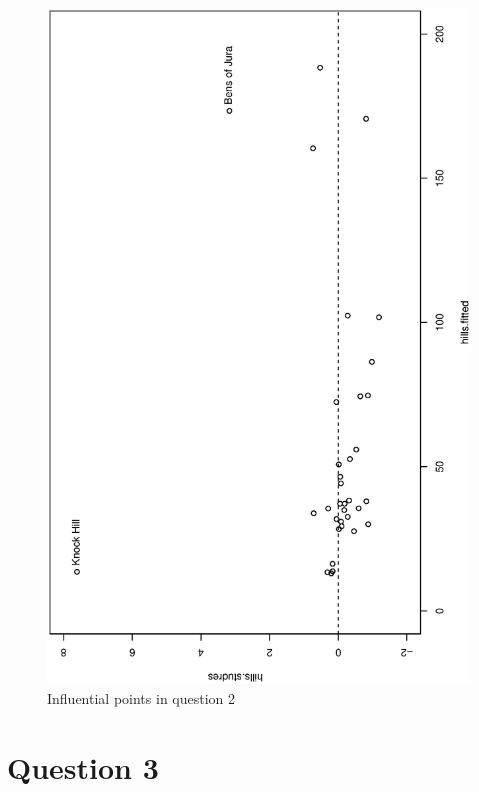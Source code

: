 \documentclass[a4paper,10pt]{article}
\begin{document}
\begin{figure}
\includegraphics[angle=-90, width=1\textwidth]{figures/math650_hw7_fig1.eps}
\caption{Influential points in question 2}\label{f1}
\end{figure}

\section{Question 3}
\end{document}
